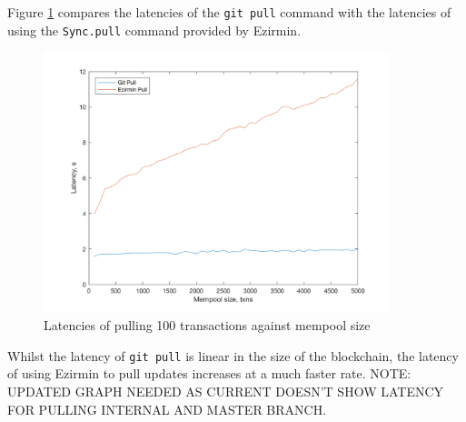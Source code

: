 \documentclass[12pt,a4paper,twoside,openright]{report}
\begin{document}
	Figure \ref{figs:gitreposize} compares the latencies of the \texttt{git pull} command with the latencies of using the \texttt{Sync.pull} command provided by Ezirmin.
	\begin{figure}
		\centering
		\includegraphics[width=0.9\textwidth]{figs/gitlatencies.png}
		\caption{Latencies of pulling 100 transactions against mempool size}
		\label{figs:gitreposize}
	\end{figure}
	Whilst the latency of \texttt{git pull} is linear in the size of the blockchain, the latency of using Ezirmin to pull updates increases at a much faster rate. NOTE: UPDATED GRAPH NEEDED AS CURRENT DOESN'T SHOW LATENCY FOR PULLING INTERNAL AND MASTER BRANCH.\\
\end{document}
